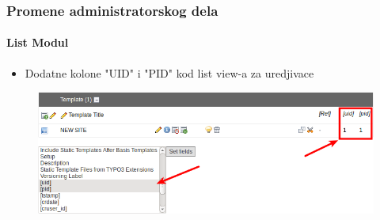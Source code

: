 
\begin{frame}[fragile]
	\frametitle{Promene administratorskog dela}
	\framesubtitle{List Modul}

	\begin{itemize}
		\item Dodatne kolone "UID" i "PID" kod list view-a za uredjivace
	\end{itemize}

	\begin{figure}
		\includegraphics[width=0.95\linewidth]{Images/BackendChanges/AdditionalColumnsInListModule.png}
	\end{figure}

\end{frame}


